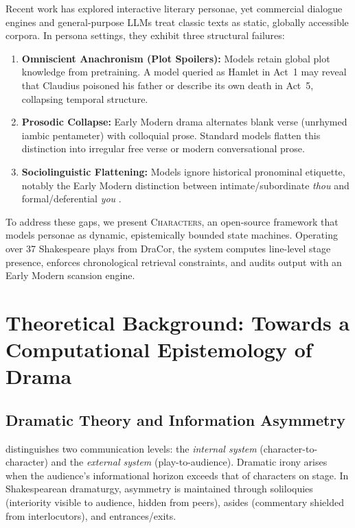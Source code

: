 \documentclass[sn-basic, referee]{sn-jnl}
\begin{document}
Recent work has explored interactive literary personae, yet commercial dialogue engines and general-purpose LLMs treat classic texts as static, globally accessible corpora. In persona settings, they exhibit three structural failures:
\begin{enumerate}
    \item \textbf{Omniscient Anachronism (Plot Spoilers):} Models retain global plot knowledge from pretraining. A model queried as Hamlet in Act~1 may reveal that Claudius poisoned his father or describe its own death in Act~5, collapsing temporal structure.
    \item \textbf{Prosodic Collapse:} Early Modern drama alternates blank verse (unrhymed iambic pentameter) with colloquial prose. Standard models flatten this distinction into irregular free verse or modern conversational prose.
    \item \textbf{Sociolinguistic Flattening:} Models ignore historical pronominal etiquette, notably the Early Modern distinction between intimate/subordinate \textit{thou} and formal/deferential \textit{you} \citep{busse2002linguistic}.
\end{enumerate}

To address these gaps, we present \textsc{Characters}, an open-source framework that models personae as dynamic, epistemically bounded state machines. Operating over 37 Shakespeare plays from DraCor, the system computes line-level stage presence, enforces chronological retrieval constraints, and audits output with an Early Modern scansion engine.

\section{Theoretical Background: Towards a Computational Epistemology of Drama}\label{sec2}

\subsection{Dramatic Theory and Information Asymmetry}
\citet{pfister1991theory} distinguishes two communication levels: the \textit{internal system} (character-to-character) and the \textit{external system} (play-to-audience). Dramatic irony arises when the audience's informational horizon exceeds that of characters on stage. In Shakespearean dramaturgy, asymmetry is maintained through soliloquies (interiority visible to audience, hidden from peers), asides (commentary shielded from interlocutors), and entrances/exits.
\end{document}
